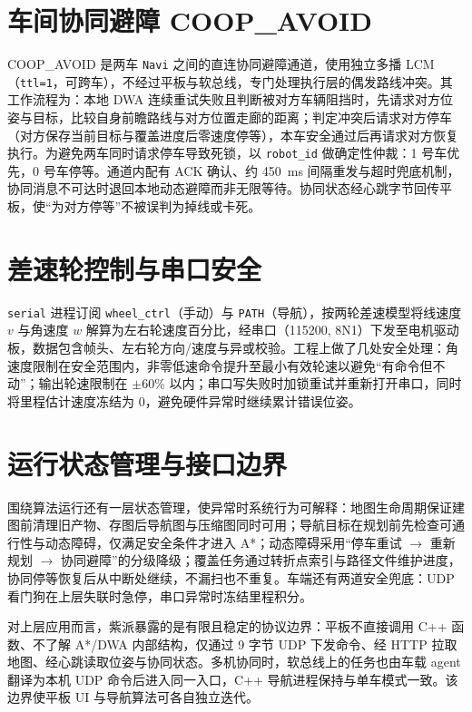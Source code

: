\section{车间协同避障 COOP\_AVOID}
\label{sec:coop-avoid}

COOP\_AVOID 是两车 \texttt{Navi} 之间的直连协同避障通道，使用独立多播 LCM（\texttt{ttl=1}，可跨车），不经过平板与软总线，专门处理执行层的偶发路线冲突。其工作流程为：本地 DWA 连续重试失败且判断被对方车辆阻挡时，先请求对方位姿与目标，比较自身前瞻路线与对方位置走廊的距离；判定冲突后请求对方停车（对方保存当前目标与覆盖进度后零速度停等），本车安全通过后再请求对方恢复执行。为避免两车同时请求停车导致死锁，以 \texttt{robot\_id} 做确定性仲裁：1 号车优先，0 号车停等。通道内配有 ACK 确认、约 450~ms 间隔重发与超时兜底机制，协同消息不可达时退回本地动态避障而非无限等待。协同状态经心跳字节回传平板，使“为对方停等”不被误判为掉线或卡死。

\section{差速轮控制与串口安全}
\label{sec:wheel-control}

\texttt{serial} 进程订阅 \texttt{wheel\_ctrl}（手动）与 \texttt{PATH}（导航），按两轮差速模型将线速度 $v$ 与角速度 $w$ 解算为左右轮速度百分比，经串口（115200, 8N1）下发至电机驱动板，数据包含帧头、左右轮方向/速度与异或校验。工程上做了几处安全处理：角速度限制在安全范围内，非零低速命令提升至最小有效轮速以避免“有命令但不动”；输出轮速限制在 $\pm$60\% 以内；串口写失败时加锁重试并重新打开串口，同时将里程估计速度冻结为 0，避免硬件异常时继续累计错误位姿。

\section{运行状态管理与接口边界}
\label{sec:state-management}

围绕算法运行还有一层状态管理，使异常时系统行为可解释：地图生命周期保证建图前清理旧产物、存图后导航图与压缩图同时可用；导航目标在规划前先检查可通行性与动态障碍，仅满足安全条件才进入 A*；动态障碍采用“停车重试 $\to$ 重新规划 $\to$ 协同避障”的分级降级；覆盖任务通过转折点索引与路径文件维护进度，协同停等恢复后从中断处继续，不漏扫也不重复。车端还有两道安全兜底：UDP 看门狗在上层失联时急停，串口异常时冻结里程积分。

对上层应用而言，紫派暴露的是有限且稳定的协议边界：平板不直接调用 C++ 函数、不了解 A*/DWA 内部结构，仅通过 9 字节 UDP 下发命令、经 HTTP 拉取地图、经心跳读取位姿与协同状态。多机协同时，软总线上的任务也由车载 agent 翻译为本机 UDP 命令后进入同一入口，C++ 导航进程保持与单车模式一致。该边界使平板 UI 与导航算法可各自独立迭代。
